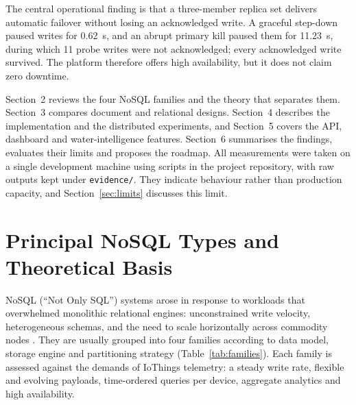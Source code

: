 \documentclass[11pt,a4paper]{article}
\begin{document}
The central operational finding is that a three-member replica set delivers automatic failover without losing an acknowledged write. A graceful step-down paused writes for 0.62~s, and an abrupt primary kill paused them for 11.23~s, during which 11 probe writes were not acknowledged; every acknowledged write survived. The platform therefore offers high availability, but it does not claim zero downtime.

Section~2 reviews the four NoSQL families and the theory that separates them. Section~3 compares document and relational designs. Section~4 describes the implementation and the distributed experiments, and Section~5 covers the API, dashboard and water-intelligence features. Section~6 summarises the findings, evaluates their limits and proposes the roadmap. All measurements were taken on a single development machine using scripts in the project repository, with raw outputs kept under \texttt{evidence/}. They indicate behaviour rather than production capacity, and Section~\ref{sec:limits} discusses this limit.

\section{Principal NoSQL Types and Theoretical Basis}

NoSQL (``Not Only SQL'') systems arose in response to workloads that overwhelmed monolithic relational engines: unconstrained write velocity, heterogeneous schemas, and the need to scale horizontally across commodity nodes \citep{cattell2011,sadalage2012}. They are usually grouped into four families according to data model, storage engine and partitioning strategy (Table~\ref{tab:families}). Each family is assessed against the demands of IoThings telemetry: a steady write rate, flexible and evolving payloads, time-ordered queries per device, aggregate analytics and high availability.
\end{document}
